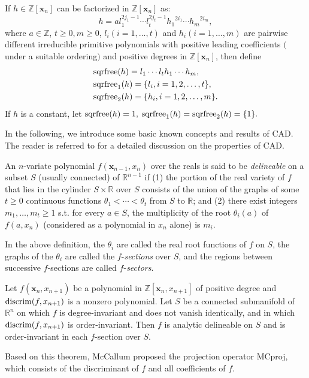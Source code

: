 \documentclass[amsthm]{elsart}
\def \MCproj  {{\rm MCproj}}
\def \discrim  {{\rm discrim}}
\def \sqrfree  {{\rm sqrfree}}
\def \RR {{\mathbb R}}
\def \ZZ {{\mathbb Z}}
\newcommand{\xx}{\bm{x}}
\begin{document}
\begin{defn}\label{de:sqrfree}
If $h$$\in \ZZ[\xx_n]$ can be factorized in $\ZZ[\xx_n]$ as:
        $$h=al_{1}^{2j_1-1}\cdots l_t^{2j_t-1}{h_1}^{2i_1}\cdots {h_m}^{2i_m},$$
        where $a\in \ZZ$, $t\ge 0, m\ge 0$, $l_i$$(i=1,\ldots,t)$ and $h_i$$(i=1,\ldots,m)$ are
pairwise different irreducible primitive polynomials with positive leading coefficients $($under a suitable ordering$)$ and positive degrees in $\ZZ[\xx_n]$,
then define
        \begin{align*}
        &\sqrfree(h)=l_{1}\cdots l_t{h_1}\cdots {h_m},\\ &\sqrfree_1(h)=\{l_i,i=1,2,\ldots,t\},\\
                &\sqrfree_2(h)=\{h_i,i=1,2,\ldots,m\}.
        \end{align*}
        If $h$ is a constant, let $\sqrfree(h)=1,$ $\sqrfree_1(h)=\sqrfree_2(h)=\{1\}.$
\end{defn}


In the following, we introduce some basic known concepts and results of CAD. The reader is referred to \cite{collins1,Hong:90a,Collins_Hong:91,McCallum1,McCallum2,Brown01a} for a detailed discussion on the properties of CAD.

\begin{defn}\citep{collins1,McCallum1}\label{def:delineable}
        An $n$-variate polynomial $f(\xx_{n-1},x_{n})$ over the reals is said to be {\em delineable} on a subset $S$ (usually connected) of $\RR^{n-1}$ if
        (1) the portion of the real variety of $f$ that lies in the cylinder $S\times \RR$ over $S$ consists of the union of the graphs of some $t\ge0$ continuous functions $\theta_1<\cdots<\theta_t$ from $S$ to $\RR$; and
        (2) there exist integers $m_1,\ldots,m_t\ge1$ s.t. for every $a\in S$, the multiplicity of the root $\theta_i(a)$ of $f(a,x_n)$ (considered as a polynomial in $x_n$ alone) is $m_i$.
\end{defn}


\begin{defn}\citep{collins1,McCallum1}
        In the above definition, the $\theta_i$ are called the real root functions of $f$ on $S$, the graphs of the $\theta_i$ are called the $f$-{\em sections} over $S$, and the regions between successive $f$-sections are called $f$-{\em sectors}.

\end{defn}

\begin{thm}\label{thm:McCallum}\citep{McCallum1,McCallum2}
        Let $f(\xx_n,x_{n+1})$ be a polynomial in $\ZZ[\xx_n,x_{n+1}]$ of positive degree and $\discrim(f,x_{n+1})$ is a nonzero polynomial. Let $S$ be a connected submanifold of $\RR^n$ on which $f$ is degree-invariant and does not vanish identically, and in which $\discrim(f,x_{n+1})$ is order-invariant. Then $f$ is analytic delineable on $S$ and is order-invariant in each $f$-section over $S$.
\end{thm}
Based on this theorem, McCallum proposed the projection operator \MCproj, which consists of the discriminant of $f$ and all coefficients of $f$.
\end{document}
